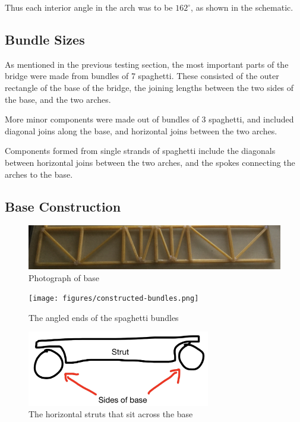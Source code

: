 \documentclass[a4paper,11pt]{article}
\begin{document}
Thus each interior angle in the arch was to be $162^\circ$, as shown in the
schematic.


\subsection{Bundle Sizes}

As mentioned in the previous testing section, the most important parts of the
bridge were made from bundles of 7 spaghetti.
These consisted of the outer rectangle of the base of the bridge, the joining
lengths between the two sides of the base, and the two arches.

More minor components were made out of bundles of 3 spaghetti, and
included diagonal joins along the base, and horizontal joins between the two
arches.

Components formed from single strands of spaghetti include the diagonals between
horizontal joins between the two arches, and the spokes connecting the arches to
the base.


\subsection{Base Construction}

\begin{figure}
\begin{center}
\includegraphics[width=\textwidth]{figures/base.png}
\end{center}
\caption{Photograph of base}
\label{construction:base}
\end{figure}

\begin{figure}
\begin{center}
\texttt{[image: figures/constructed-bundles.png]}
\end{center}
\caption{The angled ends of the spaghetti bundles}
\label{construction:bundles}
\end{figure}

\begin{figure}
\begin{center}
\includegraphics[width=8cm]{figures/struts.png}
\end{center}
\caption{The horizontal struts that sit across the base}
\label{construction:struts}
\end{figure}
\end{document}
